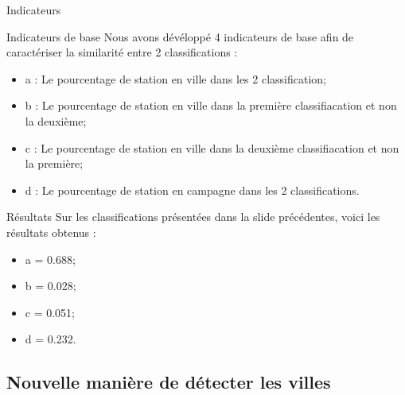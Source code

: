 \begin{frame}{Indicateurs}
    \begin{block}{Indicateurs de base}
        Nous avons dévéloppé 4 indicateurs de base afin de caractériser la similarité entre 2 classifications :
        \begin{itemize}
            \item a : Le pourcentage de station en ville dans les 2 classification;
            \item b : Le pourcentage de station en ville dans la première classifiacation et non la deuxième;
            \item c : Le pourcentage de station en ville dans la deuxième classifiacation et non la première;
            \item d : Le pourcentage de station en campagne dans les 2 classifications.
        \end{itemize}
    \end{block}
    \begin{block}{Résultats}
        Sur les classifications présentées dans la slide précédentes, voici les résultats obtenus : 
        \begin{itemize}
            \item a = 0.688;
            \item b = 0.028;
            \item c = 0.051;
            \item d = 0.232.
        \end{itemize}
    \end{block}
\end{frame}


\subsection{Nouvelle manière de détecter les villes}
\insertsubsectionframe

